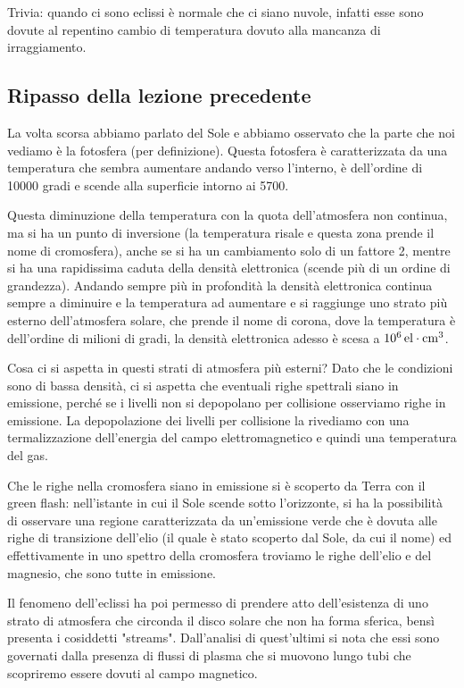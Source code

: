 Trivia: quando ci sono eclissi è normale che ci siano nuvole, infatti esse sono dovute al repentino cambio di temperatura dovuto alla mancanza di irraggiamento.

\subsection{Ripasso della lezione precedente}
La volta scorsa abbiamo parlato del Sole e abbiamo osservato che la parte che noi vediamo è la fotosfera (per definizione). Questa fotosfera è caratterizzata da una temperatura che sembra aumentare andando verso l'interno, è dell'ordine di 10000 gradi e scende alla superficie intorno ai 5700.

Questa diminuzione della temperatura con la quota dell'atmosfera non continua, ma si ha un punto di inversione (la temperatura risale e questa zona prende il nome di cromosfera), anche se si ha un cambiamento solo di un fattore 2, mentre si ha una rapidissima caduta della densità elettronica (scende più di un ordine di grandezza). Andando sempre più in profondità la densità elettronica continua sempre a diminuire e la temperatura ad aumentare e si raggiunge uno strato più esterno dell'atmosfera solare, che prende il nome di corona, dove la temperatura è dell'ordine di milioni di gradi, la densità elettronica adesso è scesa a $10^{6} \, \rm el \cdot cm^{3}$.

Cosa ci si aspetta in questi strati di atmosfera più esterni? Dato che le condizioni sono di bassa densità, ci si aspetta che eventuali righe spettrali siano in emissione, perché se i livelli non si depopolano per collisione osserviamo righe in emissione. La depopolazione dei livelli per collisione la rivediamo con una termalizzazione dell'energia del campo elettromagnetico e quindi una temperatura del gas.

Che le righe nella cromosfera siano in emissione si è scoperto da Terra con il green flash: nell'istante in cui il Sole scende sotto l'orizzonte, si ha la possibilità di osservare una regione caratterizzata da un'emissione verde che è dovuta alle righe di transizione dell'elio (il quale è stato scoperto dal Sole, da cui il nome) ed effettivamente in uno spettro della cromosfera troviamo le righe dell'elio e del magnesio, che sono tutte in emissione.

Il fenomeno dell'eclissi ha poi permesso di prendere atto dell'esistenza di uno strato di atmosfera che circonda il disco solare che non ha forma sferica, bensì presenta i cosiddetti "streams". Dall'analisi di quest'ultimi si nota che essi sono governati dalla presenza di flussi di plasma che si muovono lungo tubi che scopriremo essere dovuti al campo magnetico.

